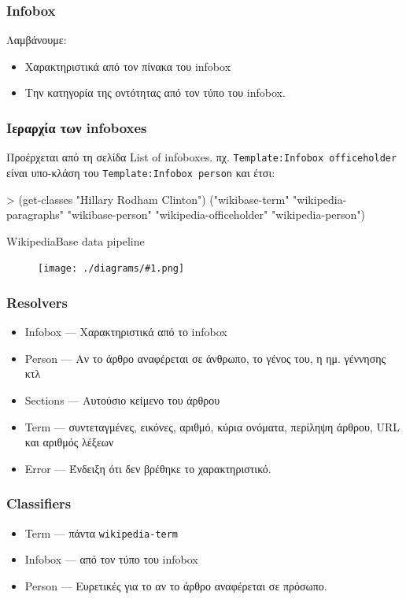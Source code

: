\documentclass[bigger]{beamer}
\newenvironment{code}{\ttfamily}{\par}
\newcommand{\figframe}[2]{
  \begin{frame}{#2}
    \vfill
    \begin{figure}
      \centering
      \texttt{[image: ./diagrams/\#1.png]}
    \end{figure}
    \vfill
  \end{frame}
}
\begin{document}
\begin{frame}
  \frametitle{Infobox}
  Λαμβάνουμε:
  \begin{itemize}
  \item Χαρακτηριστικά από τον πίνακα του infobox
  \item Την κατηγορία της οντότητας από τον τύπο του infobox.
  \end{itemize}
\end{frame}

\begin{frame}
  \frametitle{Ιεραρχία των infoboxes}

  Προέρχεται από τη σελίδα List of infoboxes.
  πχ. \texttt{Template:Infobox officeholder} είναι υπο-κλάση του
  \texttt{Template:Infobox person} και έτσι:

  \vfill
  \begin{code}
    > (get-classes "Hillary Rodham Clinton")
    ("wikibase-term"
    "wikipedia-paragraphs"
    "wikibase-person"
    "wikipedia-officeholder"
    "wikipedia-person")
  \end{code}
\end{frame}

\figframe{wikipediabase-pipeline}{WikipediaBase data pipeline}

\begin{frame}
  \frametitle{Resolvers}
  \begin{itemize}
  \item Infobox --- Χαρακτηριστικά από το infobox
  \item Person --- Αν το άρθρο αναφέρεται σε άνθρωπο, το γένος του, η
    ημ. γέννησης κτλ
  \item Sections --- Αυτούσιο κείμενο του άρθρου
  \item Term --- συντεταγμένες, εικόνες, αριθμό, κύρια ονόματα,
    περίληψη άρθρου, URL και αριθμός λέξεων
  \item Error --- Ένδειξη ότι δεν βρέθηκε το χαρακτηριστικό.
  \end{itemize}
\end{frame}

\begin{frame}
  \frametitle{Classifiers}
  \begin{itemize}
  \item Term --- πάντα \texttt{wikipedia-term}
  \item Infobox --- από τον τύπο του infobox
  \item Person --- Ευρετικές για το αν το άρθρο αναφέρεται σε πρόσωπο.
  \end{itemize}
\end{frame}
\end{document}
